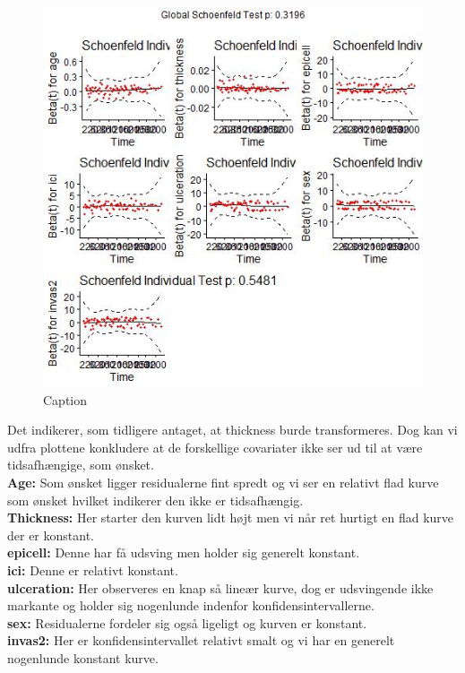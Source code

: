 \begin{figure}[h]
    \centering
    \includegraphics[width=0.7\linewidth]{Basses_kode/Billeder_duration/Schoenfeld_Residuals.jpeg}
    \caption{Caption}
    \label{fig:enter-label}
\end{figure}
\newpage
Det indikerer, som tidligere antaget, at thickness burde transformeres. Dog kan vi udfra plottene konkludere at de forskellige covariater ikke ser ud til at være tidsafhængige, som ønsket.\\
\textbf{Age:} Som ønsket ligger residualerne fint spredt og vi ser en relativt flad kurve som ønsket hvilket indikerer den ikke er tidsafhængig.\\
\textbf{Thickness:} Her starter den kurven lidt højt men vi når ret hurtigt en flad kurve der er konstant.\\
\textbf{epicell:} Denne har få udsving men holder sig generelt konstant.\\
\textbf{ici:} Denne er relativt konstant.\\
\textbf{ulceration:} Her observeres en knap så lineær kurve, dog er udsvingende ikke markante og holder sig nogenlunde indenfor konfidensintervallerne.\\
\textbf{sex:} Residualerne fordeler sig også ligeligt og kurven er konstant.\\
\textbf{invas2:} Her er konfidensintervallet relativt smalt og vi har en generelt nogenlunde konstant kurve.
\newpage
